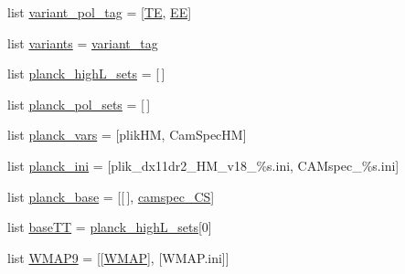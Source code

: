 \begin{DoxyCompactItemize}
\item 
list \mbox{\hyperlink{namespaceplanck_1_1settings__planck__2015_ae142c74a73ba233f974e166f47b238d7}{variant\+\_\+pol\+\_\+tag}} = \mbox{[}\textquotesingle{}\mbox{\hyperlink{plotdiffs_8m_a1a5b2ac8f21dd2ac3d0605ff0b067ec4}{TE}}\textquotesingle{}, \textquotesingle{}\mbox{\hyperlink{plotdiffs_8m_a6f96ba8525cc2f838c7d8b6888a1481b}{EE}}\textquotesingle{}\mbox{]}
\item 
list \mbox{\hyperlink{namespaceplanck_1_1settings__planck__2015_ac165ae674d9cf0faedd38cde0f548420}{variants}} = \mbox{\hyperlink{namespaceplanck_1_1settings__planck__2015_acca00fc8244ab010bc38b113dd59344e}{variant\+\_\+tag}}
\item 
list \mbox{\hyperlink{namespaceplanck_1_1settings__planck__2015_a187c33180847da73aad192566e0ebe6b}{planck\+\_\+high\+L\+\_\+sets}} = \mbox{[}$\,$\mbox{]}
\item 
list \mbox{\hyperlink{namespaceplanck_1_1settings__planck__2015_aab035a0bc4cdce16daf70ecf0ff9f946}{planck\+\_\+pol\+\_\+sets}} = \mbox{[}$\,$\mbox{]}
\item 
list \mbox{\hyperlink{namespaceplanck_1_1settings__planck__2015_a122ee58e0f574f530089491fab7e2084}{planck\+\_\+vars}} = \mbox{[}\textquotesingle{}plik\+HM\textquotesingle{}, \textquotesingle{}Cam\+Spec\+HM\textquotesingle{}\mbox{]}
\item 
list \mbox{\hyperlink{namespaceplanck_1_1settings__planck__2015_a336eb86c667a94ccf16e2b8ba7c852e7}{planck\+\_\+ini}} = \mbox{[}\textquotesingle{}plik\+\_\+dx11dr2\+\_\+\+H\+M\+\_\+v18\+\_\+\%s.\+ini\textquotesingle{}, \textquotesingle{}C\+A\+Mspec\+\_\+\%s.\+ini\textquotesingle{}\mbox{]}
\item 
list \mbox{\hyperlink{namespaceplanck_1_1settings__planck__2015_af13877a0e390b312a57fdb46a7bd2d5f}{planck\+\_\+base}} = \mbox{[}\mbox{[}$\,$\mbox{]}, \mbox{\hyperlink{namespaceplanck_1_1settings__planck__2015_a751f9b39dbe8685a881e66e05b1b2234}{camspec\+\_\+\+CS}}\mbox{]}
\item 
list \mbox{\hyperlink{namespaceplanck_1_1settings__planck__2015_a6a1fa7f737b5eca728f3a59b3bdee0d5}{base\+TT}} = \mbox{\hyperlink{namespaceplanck_1_1settings__planck__2015_a187c33180847da73aad192566e0ebe6b}{planck\+\_\+high\+L\+\_\+sets}}\mbox{[}0\mbox{]}
\item 
list \mbox{\hyperlink{namespaceplanck_1_1settings__planck__2015_ac24c38eaed352ae9b6370a2f29ad4dca}{W\+M\+A\+P9}} = \mbox{[}\mbox{[}\mbox{\hyperlink{namespaceplanck_1_1settings__planck__2015_a11ccfea42b7e06d477594502a93d9e6b}{W\+M\+AP}}\mbox{]}, \mbox{[}\textquotesingle{}W\+M\+A\+P.\+ini\textquotesingle{}\mbox{]}\mbox{]}

\end{DoxyCompactItemize}
